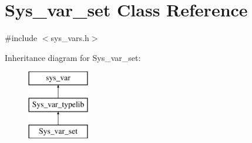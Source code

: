 \hypertarget{classSys__var__set}{}\section{Sys\+\_\+var\+\_\+set Class Reference}
\label{classSys__var__set}


{\ttfamily \#include $<$sys\+\_\+vars.\+h$>$}

Inheritance diagram for Sys\+\_\+var\+\_\+set\+:\begin{figure}[H]
\begin{center}
\leavevmode
\includegraphics[height=3.000000cm]{classSys__var__set}
\end{center}
\end{figure}
